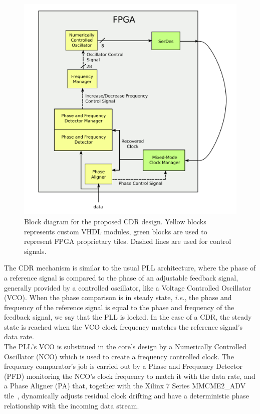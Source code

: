\documentclass[11pt]{article}
\renewcommand{\>}{\rangle} \renewcommand{\emptyset}{\varnothing}
\begin{document}
\begin{figure}[H]
  \centerline{\includegraphics[width=0.5\linewidth]{images/block}}
  \caption{Block diagram for the proposed CDR design. Yellow blocks represents
    custom VHDL modules, green blocks are used to represent FPGA proprietary
    tiles. Dashed lines are used for control signals.}
  \label{fig:cdr_overview}
\end{figure}

The CDR mechanism is similar to the usual PLL architecture, where the phase of a
reference signal is compared to the phase of an adjustable feedback signal,
generally provided by a controlled oscillator, like a Voltage Controlled
Oscillator (VCO). When the phase comparison is in steady state, \textit{i.e.},
the phase and frequency of the reference signal is equal to the phase and
frequency of the feedback signal, we say that the PLL is locked. In the case of
a CDR, the steady state is reached when the VCO clock frequency
matches the reference signal's data rate.\\
The PLL's VCO is substitued in the core's design by a Numerically Controlled
Oscillator (NCO) which is used to create a frequency controlled clock. The
frequency comparator's job is carried out by a Phase and Frequency Detector
(PFD) monitoring the NCO's clock frequency to match it with the data rate, and a
Phase Aligner (PA) that, together with the Xilinx 7 Series MMCME2\_ADV
tile~\cite{ref:mmcm}, dynamically adjusts residual clock drifting and have a
deterministic phase
relationship with the incoming data stream.\\
\end{document}
